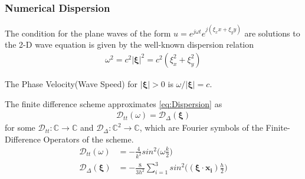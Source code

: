 \documentclass{beamer}
\begin{document}
\begin{frame}
\frametitle{Numerical Dispersion}

The condition for the plane waves of the form $u = e^{j\omega t} e^{j(\xi_x x + \xi_y y)}$ are solutions to the 2-D wave equation is given by the well-known dispersion relation
\begin{align}
\omega^2 = c^2 |\mathbf{\xi}|^2 = c^2 (\xi_x^2 + \xi_y^2) \label{eq:Dispersion}
\end{align}

The Phase Velocity(Wave Speed) for $|\mathbf{\xi}| > 0$ is $\omega / |\mathbf{\xi}| = c$.

The finite difference scheme approximates \eqref{eq:Dispersion} as
\begin{align}
\mathcal{D}_{tt}(\omega) = \mathcal{D}_{\Delta}(\mathbf{\xi}) \label{eq:DispersionFreqDomain}
\end{align}
for some $\mathcal{D}_{tt}: \mathbb{C} \rightarrow \mathbb{C}$ and $\mathcal{D}_{\Delta}: \mathbb{C}^2 \rightarrow \mathbb{C}$, which are Fourier symbols of the Finite-Difference Operators of the scheme. 
\begin{align}
\mathcal{D}_{tt}(\omega) &= -\frac{4}{k^2}sin^2\big(\omega \frac{k}{2}\big)\\
\mathcal{D}_{\Delta}(\mathbf{\xi}) &= -\frac{8}{3h^2} \sum_{i=1}^{3} sin^2\big((\mathbf{\xi}\cdot \mathbf{x_i})\frac{h}{2}\big)
\end{align}
\end{frame}


\end{document}
